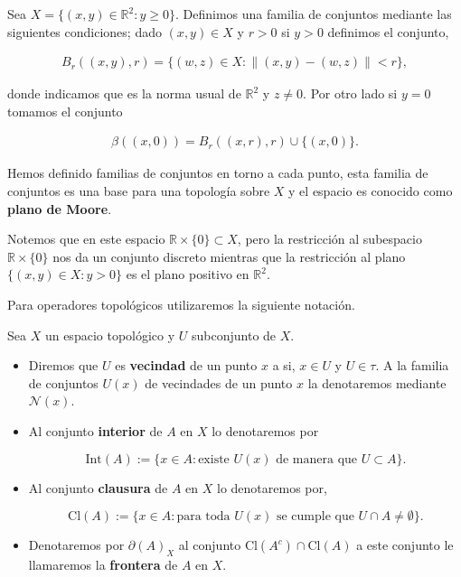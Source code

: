 \begin{ej}
Sea $X= \{(x,y) \in \mathbb{R}^2: y \geq 0 \}$. Definimos una familia de conjuntos mediante las siguientes condiciones; dado $(x,y) \in X$ y $r>0$ si $y > 0$ definimos el conjunto,

\begin{align*}
B_r((x,y),r)=\{(w,z) \in X : \| (x,y)-(w,z) \| < r \},
\end{align*}

donde indicamos que es la norma usual de $\mathbb{R}^2$ y $z \neq 0$. Por otro lado si $y=0$ tomamos el conjunto 

\begin{align*}
\beta((x,0))=B_r((x,r),r) \cup \{(x,0)\}.
\end{align*}

Hemos definido familias de conjuntos en torno a cada punto, esta familia de conjuntos es una base para una topología sobre $X$ y el espacio es conocido como \textbf{plano de Moore}.

Notemos que en este espacio $\mathbb{R} \times \{0\} \subset X$, pero la restricción al subespacio $\mathbb{R} \times \{0\}$ nos da un conjunto discreto mientras que la restricción al plano $\{(x,y)\in X :y > 0 \}$ es el plano positivo en $\mathbb{R}^2.$
\end{ej}


Para operadores topológicos utilizaremos la siguiente notación. 

\begin{df}
Sea $X$ un espacio topológico y $U$ subconjunto de $X$.

\begin{itemize}
	\item Diremos que $U$ es \textbf{vecindad} de un punto $x$ a si, $x \in U$ y $U \in \tau$. A la familia de conjuntos $U(x)$ de vecindades de un punto $x$ la denotaremos mediante $\mathcal{N}(x)$.
 
 \item Al conjunto \textbf{interior} de $A$ en $X$ lo denotaremos por 
 
  $$\mathrm{Int}(A):=\{x \in A: \text{existe } U(x) \text{ de manera que } U \subset A\}.$$
  

 \item  Al conjunto  \textbf{clausura} de $A$ en $X$ lo denotaremos por, 
  
$$\mathrm{Cl}(A):=\{x \in A: \text{para toda } U(x) \text{ se cumple  que } U \cap A \neq \emptyset\}.$$
 
 \item Denotaremos por  $\partial(A)_X$ al conjunto $\mathrm{Cl}(A^c) \cap \mathrm{Cl}(A) $ a este conjunto le llamaremos la 
  \textbf{frontera} de $A$ en $X$.
 \end{itemize}
\end{df}

